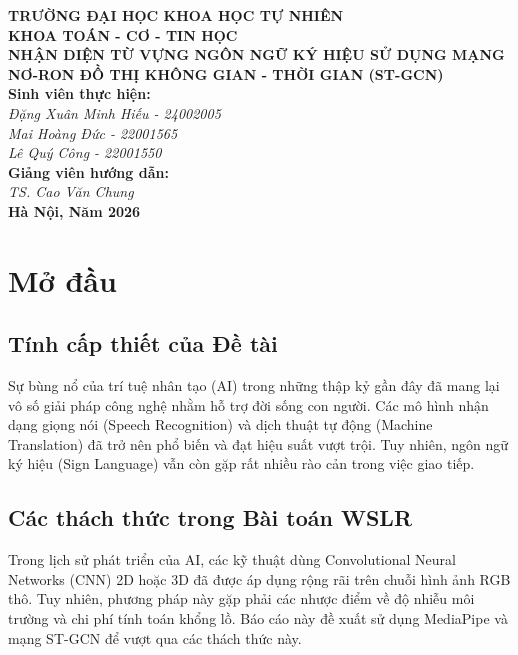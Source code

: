 \documentclass[a4paper,12pt]{report}
\begin{document}
\begin{titlepage}
    \centering
    \vspace*{2cm}
    \Large \textbf{TRƯỜNG ĐẠI HỌC KHOA HỌC TỰ NHIÊN}\\
    \Large \textbf{KHOA TOÁN - CƠ - TIN HỌC}\\
    \vspace{1cm}
    \LARGE \textbf{NHẬN DIỆN TỪ VỰNG NGÔN NGỮ KÝ HIỆU SỬ DỤNG MẠNG NƠ-RON ĐỒ THỊ KHÔNG GIAN - THỜI GIAN (ST-GCN)}\\
    \vspace{2cm}
    \Large \textbf{Sinh viên thực hiện:}\\
    \vspace{0.5cm}
    \textit{Đặng Xuân Minh Hiếu - 24002005}\\
    \vspace{1cm}
    \textit{Mai Hoàng Đức - 22001565}\\
    \textit{Lê Quý Công - 22001550}\\
    \vspace{1cm}
    \Large \textbf{Giảng viên hướng dẫn:}\\
    \vspace{0.5cm}
    \textit{TS. Cao Văn Chung}\\
    \vfill
    \Large \textbf{Hà Nội, Năm 2026}
\end{titlepage}

\tableofcontents
\listoffigures
\listoftables
\newpage

\chapter*{Mở đầu}

\section*{Tính cấp thiết của Đề tài}
Sự bùng nổ của trí tuệ nhân tạo (AI) trong những thập kỷ gần đây đã mang lại vô số giải pháp công nghệ nhằm hỗ trợ đời sống con người. Các mô hình nhận dạng giọng nói (Speech Recognition) và dịch thuật tự động (Machine Translation) đã trở nên phổ biến và đạt hiệu suất vượt trội. Tuy nhiên, ngôn ngữ ký hiệu (Sign Language) vẫn còn gặp rất nhiều rào cản trong việc giao tiếp.

\section*{Các thách thức trong Bài toán WSLR}
Trong lịch sử phát triển của AI, các kỹ thuật dùng Convolutional Neural Networks (CNN) 2D hoặc 3D đã được áp dụng rộng rãi trên chuỗi hình ảnh RGB thô. Tuy nhiên, phương pháp này gặp phải các nhược điểm về độ nhiễu môi trường và chi phí tính toán khổng lồ. Báo cáo này đề xuất sử dụng MediaPipe và mạng ST-GCN để vượt qua các thách thức này.
\end{document}
